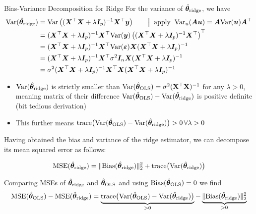 \documentclass[11pt,compress,t,notes=noshow, xcolor=table]{beamer}
\begin{document}
\begin{vbframe}{Bias-Variance Decomposition for Ridge}
    For the variance of $\hat{\bm{\theta}}_{\text{ridge}}$, we have
    \begin{equation*}
        \begin{aligned}
            \text{Var}(\hat{\bm{\theta}}_{\text{ridge}})  &= \text{Var}\left((\bm{X}^{\top}\bm{X} +\lambda\bm{I}_p )^{-1} \bm{X}^{\top}\bm{y}\right) \quad \quad \big| \;\; \text{apply} \;\; \text{Var}_u(\bm{A}\bm{u}) = \bm{A} \text{Var}(\bm{u}) \bm{A}^{\top} \\
            &= (\bm{X}^{\top}\bm{X} +\lambda\bm{I}_p )^{-1} \bm{X}^{\top} \text{Var}(\bm{y}) \left( (\bm{X}^{\top}\bm{X} +\lambda\bm{I}_p )^{-1} \bm{X}^{\top} \right)^{\top} \\
            &= (\bm{X}^{\top}\bm{X} +\lambda\bm{I}_p )^{-1} \bm{X}^{\top} \text{Var}(\bm{\varepsilon}) \bm{X} (\bm{X}^{\top}\bm{X} +\lambda\bm{I}_p )^{-1}  \\
            &=  (\bm{X}^{\top}\bm{X} +\lambda\bm{I}_p )^{-1} \bm{X}^{\top} \sigma^2 \bm{I}_n \bm{X} (\bm{X}^{\top}\bm{X} +\lambda\bm{I}_p )^{-1}  \\
            &= \sigma^2 (\bm{X}^{\top}\bm{X} +\lambda\bm{I}_p )^{-1} \bm{X}^{\top} \bm{X} (\bm{X}^{\top}\bm{X} +\lambda\bm{I}_p )^{-1}  \\
        \end{aligned}
    \end{equation*}

\begin{itemize}
    \item $\text{Var}(\hat{\bm{\theta}}_{\text{ridge}})$ is strictly smaller than $\text{Var}(\hat{\bm{\theta}}_{\text{OLS}})=\sigma^2 (\mathbf{X}^{\top}\mathbf{X})^{-1}$ for any $\lambda>0$, meaning matrix of their difference $\text{Var}(\hat{\bm{\theta}}_{\text{OLS}})-\text{Var}(\hat{\bm{\theta}}_{\text{ridge}})$ is positive definite (bit tedious derivation)
    \item This further means $\text{trace}\big({\text{Var}(\hat{\bm{\theta}}_{\text{OLS}})}-{\text{Var}(\hat{\bm{\theta}}_{\text{ridge}})}\big)>0 \, \forall \lambda>0$
\end{itemize}

\framebreak

Having obtained the bias and variance of the ridge estimator, we can decompose its mean squared error as follows:

$$\text{MSE}(\hat{\bm{\theta}}_{\text{ridge}})=\Vert \text{Bias}(\hat{\bm{\theta}}_{\text{ridge}})\Vert_2^2 + \text{trace}\big(\text{Var}(\hat{\bm{\theta}}_{\text{ridge}})\big)$$

Comparing MSEs of $\hat{\bm{\theta}}_{\text{ridge}}$ and $\hat{\bm{\theta}}_{\text{OLS}}$ and using $\text{Bias}(\hat{\bm{\theta}}_{\text{OLS}})=0$ we find 
$$\text{MSE}(\hat{\bm{\theta}}_{\text{OLS}})-\text{MSE}(\hat{\bm{\theta}}_{\text{ridge}}) = \underbrace{\text{trace}\big({\text{Var}(\hat{\bm{\theta}}_{\text{OLS}})}-{\text{Var}(\hat{\bm{\theta}}_{\text{ridge}})}\big)}_{>0} - \underbrace{\Vert \text{Bias}(\hat{\bm{\theta}}_{\text{ridge}})\Vert_2^2}_{>0}$$


\end{vbframe}
\end{document}
